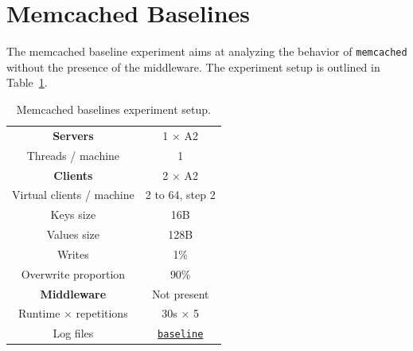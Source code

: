 \documentclass[11pt]{article}
\theoremstyle{definition}
\renewcommand\b[1]{{\bf{#1}}}
\renewcommand\t\texttt
\begin{document}
\section{Memcached Baselines}\label{sec:baseline}

The memcached baseline experiment aims at analyzing the behavior of \t{memcached} without the presence of the middleware.
The experiment setup is outlined in Table~\ref{tab:exp1}.

\begin{table}[!h]
    \centering
    \small
    {
        \smallskip
        \begin{tabular}{|c|c|}
            \hline \b{Servers} & 1 $\times$ A2 \\ 
            {Threads / machine} & 1 \\ 
            \hline\hline \b{Clients} & 2 $\times$ A2 \\ 
            Virtual clients / machine & 2 to 64, step 2 \\ 
            {Keys size} & 16B \\
            {Values size} & 128B \\
            {Writes} & 1\% \\
            {Overwrite proportion} & 90\% \\
            \hline\hline \b{Middleware} & Not present \\ 
            \hline\hline Runtime $\times$ repetitions & 30s $\times$ 5 \\ 
            Log files & \hyperref[f:baseline]{\t{baseline}} \\
            \hline 
        \end{tabular}
    }
    \caption{Memcached baselines experiment setup.}
    \label{tab:exp1}
\end{table}
\end{document}

